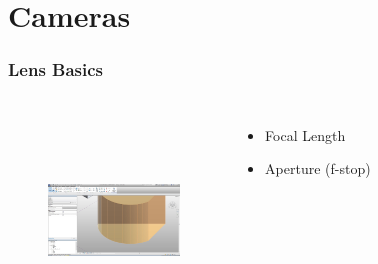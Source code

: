 \section{Cameras}

\begin{frame}
\frametitle{Lens Basics}
       \begin{columns}
             \centering
						
						\begin{figure}
							\centering
								\includegraphics[height=5cm, width=3.5cm]{img/AddingEdges.JPG}
							\label{fig:AddingEdges}
						\end{figure}
						
						\begin{itemize}
							\item Focal Length
							\item Aperture (f-stop)
						\end{itemize}
         \end{columns} 
\end{frame}

